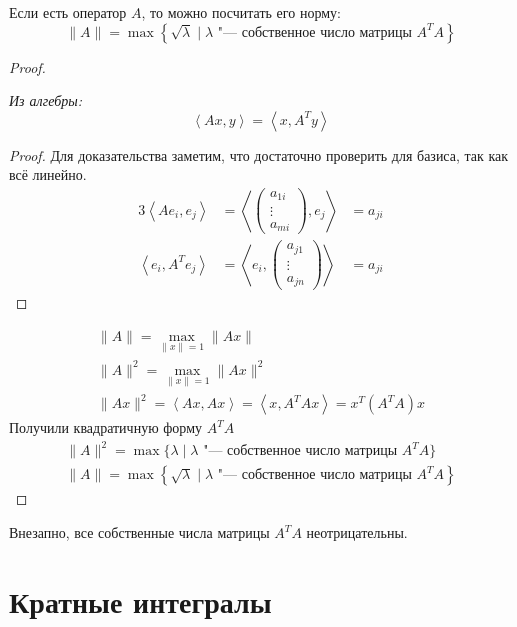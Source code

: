 \begin{conseq}
	Если есть оператор $A$, то можно посчитать его норму:
	\[ \|A\| = \max \left\{\sqrt{\lambda} \mid \text{$\lambda$ "--- собственное число матрицы $A^TA$} \right\} \]
\end{conseq}
\begin{proof}
	\begin{assertion}
		\textit{Из алгебры:}
		\[ \left<Ax, y\right> = \left<x, A^T y\right> \]
	\end{assertion}
	\begin{proof}
		Для доказательства заметим, что достаточно проверить для базиса, так как всё линейно.
		\begin{alignat*}{3}
			\left<Ae_i, e_j\right> &= \left< \begin{pmatrix} a_{1i} \\ \vdots \\ a_{mi} \end{pmatrix}, e_j \right> &= a_{ji} \\
			\left<e_i, A^Te_j\right> &= \left< e_i, \begin{pmatrix} a_{j1} \\ \vdots \\ a_{jn} \end{pmatrix} \right> &= a_{ji}
		\end{alignat*}
	\end{proof}

	\begin{gather*}
		\|A\| = \max_{\|x\| = 1} \|Ax\| \\
		\|A\|^2 = \max_{\|x\| = 1} \|Ax\|^2 \\
		\|Ax\|^2 = \left< Ax, Ax \right> = \left<x, A^TAx\right> = x^T(A^TA)x
	\end{gather*}
	Получили квадратичную форму $A^TA$
	\begin{gather*}
		\|A\|^2 = \max \{\lambda \mid \text{$\lambda$ "--- собственное число матрицы $A^TA$}\} \\
		\|A\| = \max \left\{\sqrt{\lambda} \mid \text{$\lambda$ "--- собственное число матрицы $A^TA$} \right\}
	\end{gather*}
\end{proof}

\begin{conseq}
	Внезапно, все собственные числа матрицы $A^TA$ неотрицательны.
\end{conseq}

\chapter{Кратные интегралы}

